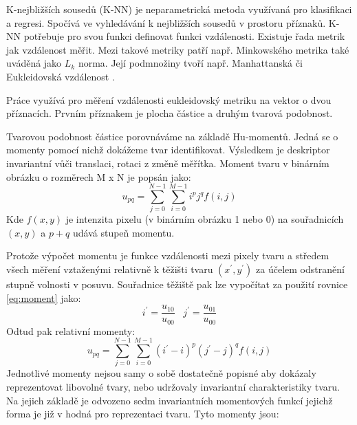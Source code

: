 \documentclass[11pt,twoside,a4paper,table]{book}
\begin{document}
K-nejbližších sousedů (K-NN) je neparametrická metoda využívaná pro klasifikaci a regresi. Spočívá ve vyhledávání k nejbližších sousedů v prostoru příznaků. K-NN potřebuje pro svou funkci definovat funkci vzdálenosti. Existuje řada metrik jak vzdálenost měřit. Mezi takové metriky patří např. Minkowského metrika také uváděná jako $L_{k}$ norma. Její podmnožiny tvoří např. Manhattanská či Eukleidovská vzdálenost \cite{book:pattern_class}.

Práce využívá pro měření vzdálenosti eukleidovský metriku na vektor o dvou příznacích. Prvním příznakem je plocha částice a druhým tvarová podobnost.

Tvarovou podobnost částice porovnáváme na základě Hu-momentů\citep{art:hu_moments}. Jedná se o momenty pomocí nichž dokážeme tvar identifikovat. Výsledkem je deskriptor invariantní vůči translaci, rotaci z změně měřítka. Moment tvaru v binárním obrázku o rozměrech M x N je popsán jako:
\begin{equation}
u_{pq} = \sum^{N-1}_{j=0}\sum^{M-1}_{i=0} i^p j^q f(i,j)
\label{eq:moment}
\end{equation}
Kde $f(x,y)$ je intenzita pixelu (v binárním obrázku 1 nebo 0) na souřadnicích $(x,y)$ a $p+q$ udává stupeň momentu.

Protože výpočet momentu je funkce vzdálenosti mezi pixely tvaru a středem všech měření vztaženými relativně k těžišti tvaru $(x^\prime, y^\prime)$  za účelem odstranění stupně volnosti v posuvu. Souřadnice těžiště pak lze vypočítat za použití rovnice \ref{eq:moment} jako:
\begin{equation}
i^\prime = \frac{u_{10}}{u_{00}} \,\,\,\,\, j^\prime = \frac{u_{01}}{u_{00}}
\end{equation}
Odtud pak relativní momenty:
\begin{equation}
u_{pq} = \sum^{N-1}_{j=0}\sum^{M-1}_{i=0} (i^\prime - i)^p (j^\prime -j)^q f(i,j)
\end{equation}
Jednotlivé momenty nejsou samy o sobě dostatečně popisné aby dokázaly reprezentovat libovolné tvary, nebo udržovaly invariantní charakteristiky tvaru. Na jejich základě je odvozeno sedm invariantních momentových funkcí jejichž forma je již v hodná pro reprezentaci tvaru. Tyto momenty jsou:
\end{document}

